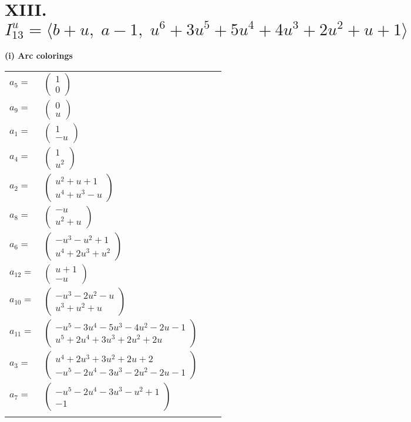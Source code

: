 \documentclass[1p]{elsarticle_modified}
\theoremstyle{definition}
\begin{document}
\centering \section*{XIII. $I^u_{13}= \langle b+u,\;a-1,\;u^6+3 u^5+5 u^4+4 u^3+2 u^2+u+1 \rangle$}
\flushleft \textbf{(i) Arc colorings}\\
\begin{tabular}{m{7pt} m{180pt} m{7pt} m{180pt} }
\flushright $a_{5}=$&$\begin{pmatrix}1\\0\end{pmatrix}$ \\
\flushright $a_{9}=$&$\begin{pmatrix}0\\u\end{pmatrix}$ \\
\flushright $a_{1}=$&$\begin{pmatrix}1\\- u\end{pmatrix}$ \\
\flushright $a_{4}=$&$\begin{pmatrix}1\\u^2\end{pmatrix}$ \\
\flushright $a_{2}=$&$\begin{pmatrix}u^2+u+1\\u^4+u^3- u\end{pmatrix}$ \\
\flushright $a_{8}=$&$\begin{pmatrix}- u\\u^2+u\end{pmatrix}$ \\
\flushright $a_{6}=$&$\begin{pmatrix}- u^3- u^2+1\\u^4+2 u^3+u^2\end{pmatrix}$ \\
\flushright $a_{12}=$&$\begin{pmatrix}u+1\\- u\end{pmatrix}$ \\
\flushright $a_{10}=$&$\begin{pmatrix}- u^3-2 u^2- u\\u^3+u^2+u\end{pmatrix}$ \\
\flushright $a_{11}=$&$\begin{pmatrix}- u^5-3 u^4-5 u^3-4 u^2-2 u-1\\u^5+2 u^4+3 u^3+2 u^2+2 u\end{pmatrix}$ \\
\flushright $a_{3}=$&$\begin{pmatrix}u^4+2 u^3+3 u^2+2 u+2\\- u^5-2 u^4-3 u^3-2 u^2-2 u-1\end{pmatrix}$ \\
\flushright $a_{7}=$&$\begin{pmatrix}- u^5-2 u^4-3 u^3- u^2+1\\-1\end{pmatrix}$\\&\end{tabular}
\end{document}
